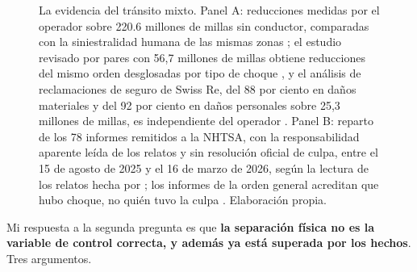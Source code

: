 \documentclass[11pt,letterpaper]{article}
\begin{document}
\begin{figure}[tbp]
  \caption{La evidencia del tránsito mixto. Panel A: reducciones medidas por el
  operador sobre \num{220.6} millones de millas sin conductor, comparadas con la
  siniestralidad humana de las mismas zonas
  \parencite{waymoimpact2026,waymoblog2026}; el estudio revisado por pares con
  56,7 millones de millas obtiene reducciones del mismo orden desglosadas por
  tipo de choque \parencite{kusano2025}, y el análisis de reclamaciones de seguro
  de Swiss Re, del 88 por ciento en daños materiales y del 92 por ciento en daños
  personales sobre 25,3 millones de millas, es independiente del operador
  \parencite{dilillo2024}. Panel B: reparto de los 78 informes remitidos a la
  NHTSA, con la responsabilidad aparente leída de los relatos y sin resolución
  oficial de culpa, entre el 15 de agosto de 2025 y el 16 de marzo de 2026, según la lectura
  de los relatos hecha por \textcite{lee2026}; los informes de la orden general
  acreditan que hubo choque, no quién tuvo la culpa \parencite{nhtsasgo2026}.
  Elaboración propia.}
  \label{fig:mixto}
\end{figure}

Mi respuesta a la segunda pregunta es que \textbf{la separación física no es la
variable de control correcta, y además ya está superada por los hechos}. Tres
argumentos.
\end{document}
